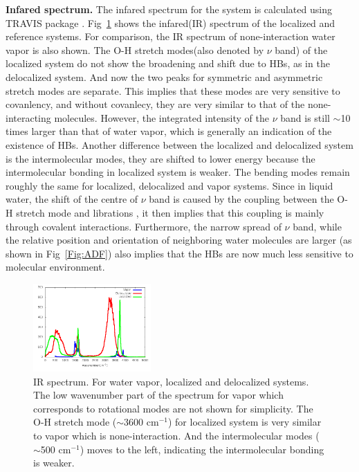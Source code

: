 \documentclass[prl,twocolumn,showpacs]{revtex4}
\begin{document}
\textbf{Infared spectrum.} The infared spectrum for the system is calculated using TRAVIS package \cite{brehm2012travis}. Fig~\ref{Fig:IR} shows the infared(IR) spectrum of the localized and reference systems. For comparison, the IR spectrum of none-interaction water vapor is also shown. The O-H stretch modes(also denoted by $\nu$ band) of the localized system do not show the broadening and shift due to HBs, as in the delocalized system. And now the two peaks for symmetric and asymmetric stretch modes are separate. This implies that these modes are very sensitive to covanlency, and without covanlecy, they are very similar to that of the none-interacting molecules. \new However, the integrated intensity of the $\nu$ band is still $\sim$10 times larger than that of water vapor, which is generally an indication of the existence of HBs. \old Another difference between the localized and delocalized system is the intermolecular modes, they are shifted to lower energy because the intermolecular bonding in localized system is weaker. The bending modes remain roughly the same for localized, delocalized and vapor systems. Since in liquid water, the shift of the centre of $\nu$ band is caused by the coupling between the O-H stretch mode and librations \cite{marechal2006hydrogen}, it then implies that this coupling is mainly through covalent interactions. Furthermore, the narrow spread of $\nu$ band, while the relative position and orientation of neighboring water molecules are larger (as shown in Fig~\ref{Fig:ADF}) also implies that the HBs are now much less sensitive to molecular environment.

\begin{figure}
\includegraphics[width=0.4\textwidth]{all_ir}
\caption{IR spectrum. For water vapor, localized and delocalized systems. The low wavenumber part of the spectrum for vapor which corresponds to rotational modes are not shown for simplicity.  The O-H stretch mode ($\sim$3600 cm$^{-1}$) for localized system is very similar to vapor which is none-interaction. And the intermolecular modes ($\sim$500 cm$^{-1}$) moves to the left, indicating the intermolecular bonding is weaker. } \label{Fig:IR}
\end{figure}
\end{document}
